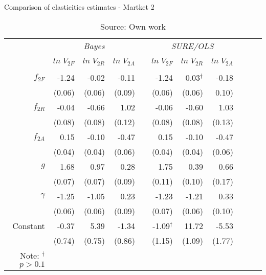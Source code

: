 \begin{table} 
\caption{Comparison of elasticities estimates - Martket 2}
\label{tbl:mkt2_weak}
\centering
\begin{tabular}{rrrrrrrrrrr}
  \toprule 
 & \multicolumn{3}{c}{\textit{Bayes}} && \multicolumn{3}{c}{\textit{SURE/OLS}} \\ 
\cline{2-4} \cline{6-8} 
\\[-1.8ex] & $ln \; V_{2F}$ & $ln \; V_{2R}$ & $ln \; V_{2A}$ & & $ln \; V_{2F}$ & $ln \; V_{2R}$ & $ln \; V_{2A}$ \\ 
\hline \\[-1.8ex] 

  $f_{2F}$ & -1.24  & \cellcolor{gray!25}-0.02 & \cellcolor{gray!25}-0.11 & & -1.24 & 0.03$^{\dagger}$ & \cellcolor{gray!25}-0.18\\
  		     & (0.06)  & (0.06) & (0.09) & & (0.06) & (0.06) & 0.10)\\ [0.2cm]
  $f_{2R}$ & \cellcolor{gray!25}-0.04 & -0.66 & 1.02 & & \cellcolor{gray!25}-0.06 & -0.60 & 1.03\\
  			   & (0.08) &  (0.08) & (0.12) & & (0.08) & (0.08) & (0.13)\\ [0.2cm]
  $f_{2A}$ & 0.15 & \cellcolor{gray!25}-0.10 & -0.47 & &0.15 & \cellcolor{gray!25}-0.10 & -0.47 \\
           & (0.04) & (0.04) & (0.06) & &(0.04) & (0.04) & (0.06)\\ [0.2cm]
  $g$      & 1.68 & 0.97 & 0.28  & &1.75 & 0.39 & 0.66\\
  		     & (0.07) & (0.07) & (0.09) & &(0.11) & (0.10) & (0.17)\\ [0.2cm]
  $\gamma$ & -1.25  & -1.05 & \cellcolor{gray!25}0.23 & &-1.23 & -1.21 & \cellcolor{gray!25}0.33\\
  			   & (0.06) & (0.06) & (0.09) & &(0.07) & (0.06) & (0.10)\\ [0.2cm]
  Constant &-0.37  & 5.39 & -1.34 & &-1.09$^{\dagger}$ & 11.72 & -5.53\\
  			   & (0.74) & (0.75) & (0.86) & &(1.15) & (1.09) & (1.77)\\ [0.2cm]
\bottomrule
Note: $^{\dagger}$ $p>0.1$
\end{tabular}
\caption*{Source: Own work}
\end{table}



